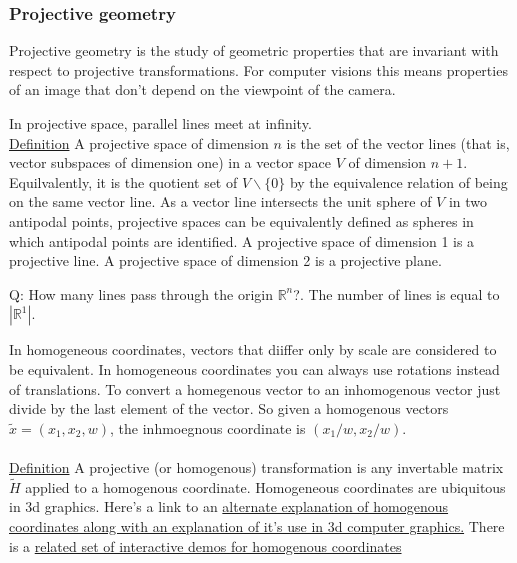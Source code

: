 \documentclass{beamer}
\theoremstyle{definition}
\renewcommand{\=}{&=&}
\newcommand{\<}{\langle}
\renewcommand{\>}{\rangle}
\begin{document}
\begin{frame}[t]
\frametitle{ Projective geometry}
Projective geometry is the study of geometric properties that are invariant
with respect to projective transformations. For computer visions this means
properties
of an image that don't depend on the viewpoint of the camera.

In projective space, parallel lines meet at infinity. \\
\underline{Definition} A projective space of dimension $n$ is the set of the
vector lines (that is, vector subspaces of dimension one) in a vector space $V$
of dimension $n+1$. Equilvalently, it is the quotient set of $V \backslash \{0\}$ by the
equivalence relation of being on the same vector line. As a vector line
intersects the unit sphere of $V$ in two antipodal points, projective spaces can
be equivalently defined as spheres in which antipodal points are identified. A
projective space of dimension 1 is a projective line. A projective space of
dimension 2 is a projective plane. 

Q: How many lines pass through the origin $\mathbb{R}^n$?.
The number of lines is equal to $|\mathbb{R}^1|$.
\end{frame}
\begin{frame}[t]
In homogeneous coordinates, vectors that diiffer only by scale are considered
to be equivalent. In homogeneous coordinates you can always use rotations
instead of translations. To convert a homegenous vector to an inhomogenous
vector just divide by the last element of the vector.  So given a homogenous
vectors $\widetilde{x} = (x_1, x_2, w)$, the inhmoegnous coordinate is $(x_1/w, x_2/w)$.\\\\
\underline{Definition} A projective (or homogenous) transformation is any
invertable  matrix $\widetilde{H}$ applied to a homogenous coordinate.
Homogeneous coordinates are ubiquitous in 3d graphics. Here's a link to an 
\href{https://hackernoon.com/programmers-guide-to-homogeneous-coordinates-73cbfd2bcc65}{alternate
explanation of homogenous coordinates along with an explanation of it's use in
3d computer graphics.}
 There is a 
\href{http://wordsandbuttons.online/interactive_guide_to_homogeneous_coordinates.html}{related set of interactive demos for homogenous coordinates}

\end{frame}
\end{document}
